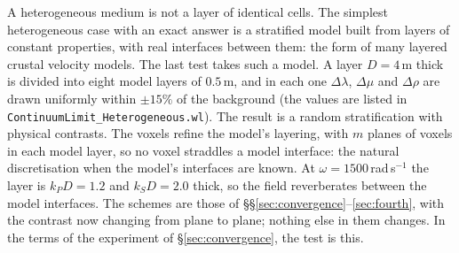 \documentclass[11pt,a4paper]{article}
\newcommand{\nb}[1]{\texttt{#1}}
\begin{document}
A heterogeneous medium is not a layer of identical cells. The simplest heterogeneous case with an
exact answer is a stratified model built from layers of constant properties, with real interfaces
between them: the form of many layered crustal velocity models. The last test takes such a model. A
layer $D=4$\,m thick is divided into eight model layers of $0.5$\,m, and in each one $\Delta\lambda$, $\Delta\mu$
and $\Delta\rho$ are drawn uniformly within $\pm15\%$ of the background (the values are listed in
\nb{ContinuumLimit\_Heterogeneous.wl}). The result is a random stratification with physical contrasts. The voxels refine
the model's layering, with $m$ planes of voxels in each model layer, so no voxel straddles a model
interface: the natural discretisation when the model's interfaces are known. At $\omega=1500$\,rad\,s$^{-1}$ the layer is
$k_PD=1.2$ and $k_SD=2.0$ thick, so the field reverberates between the model interfaces. The schemes are those of \S\S\ref{sec:convergence}--\ref{sec:fourth}, with the
contrast now changing from plane to plane; nothing else in them changes. In the terms of the
experiment of \S\ref{sec:convergence}, the test is this.
\end{document}
